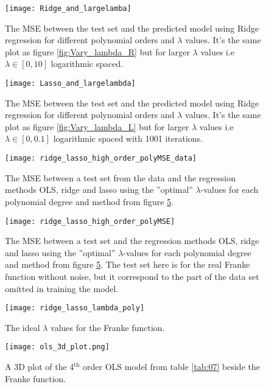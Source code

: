 \documentclass[uio,jmp,amsmath,amssymb,reprint,nofootinbib]{revtex4-1}
\numberwithin{equation}{section}
\begin{document}
\begin{figure}[H]
    \centering
    \texttt{[image: Ridge\_and\_largelamba]}
    \caption{The MSE between the test set and the predicted model using Ridge regression for different polynomial orders and \(\lambda\) values. It's the same plot as figure \ref{fig:Vary_lambda_R} but for larger \(\lambda\) values i.e \(\lambda \in [0, 10]\) logarithmic spaced.}
    \label{fig:Vary_lambda_R2}
\end{figure}

\begin{figure}[H]
    \centering
    \texttt{[image: Lasso\_and\_largelambda]}
    \caption{The MSE between the test set and the predicted model using Ridge regression for different polynomial orders and \(\lambda\) values. It's the same plot as figure \ref{fig:Vary_lambda_L} but for larger \(\lambda\) values i.e \(\lambda \in [0, 0.1]\) logarithmic spaced with 1001 iterations.}
    \label{fig:Vary_lambda_L2}
\end{figure}

\begin{figure}[H]
    \centering
    \texttt{[image: ridge\_lasso\_high\_order\_polyMSE\_data]}
    \caption{The MSE between a test set from the data and the regression methods OLS, ridge and lasso using the ''optimal'' \(\lambda\)-values for each polynomial degree and method from figure \ref{fig:optimal_lambdas}.}
    \label{fig:optimal_mse_franke}
\end{figure}

\begin{figure}[H]
    \centering
    \texttt{[image: ridge\_lasso\_high\_order\_polyMSE]}
    \caption{The MSE between a test set and the regression methods OLS, ridge and lasso using the ''optimal'' \(\lambda\)-values for each polynomial degree and method from figure \ref{fig:optimal_lambdas}. The test set here is for the real Franke function without noise, but it correspond to the part of the data set omitted in training the model.}
    \label{fig:optimal_mse_data}
\end{figure}

\begin{figure}[H]
    \centering
    \texttt{[image: ridge\_lasso\_lambda\_poly]}
    \caption{The ideal \(\lambda\) values for the Franke function.}
    \label{fig:optimal_lambdas}
\end{figure}

\begin{figure}[H]
    \centering
    \texttt{[image: ols\_3d\_plot.png]}
    \caption{A 3D plot of the 4\(^\text{th}\) order OLS model from table \ref{tab:07} beside the Franke function.}
    \label{fig:ols_3d}
\end{figure}
\end{document}

